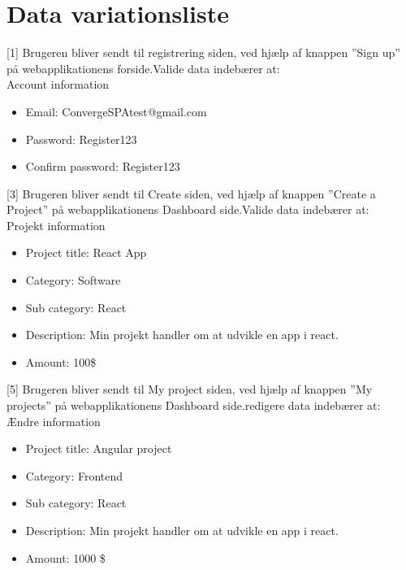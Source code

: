 \chapter{Data variationsliste}
\label{sec:data_variation_list}
[1] Brugeren bliver sendt til registrering siden, ved hjælp af knappen ''Sign up'' på webapplikationens forside.\newline \newline
[2] Valide data indebærer at:\\
Account information
\begin{itemize}
	\item Email: ConvergeSPAtest@gmail.com
	\item Password: Register123
	\item Confirm password: Register123
\end{itemize}

[3] Brugeren bliver sendt til Create siden, ved hjælp af knappen ''Create a Project'' på webapplikationens Dashboard side.\newline \newline
[4] Valide data indebærer at:\\
Projekt information
\begin{itemize}
	\item Project title: React App
    \item Category: Software
    \item Sub category: React
    \item Description: Min projekt handler om at udvikle en app i react.
    \item Amount: 100\$ 
\end{itemize}

[5] Brugeren bliver sendt til My project siden, ved hjælp af knappen ''My projects'' på webapplikationens Dashboard side.\newline \newline
[6] redigere data indebærer at:\\
Ændre information
\begin{itemize}
	\item Project title: Angular project
    \item Category: Frontend
    \item Sub category: React
    \item Description: Min projekt handler om at udvikle en app i react.
    \item Amount: 1000 \$
\end{itemize}

